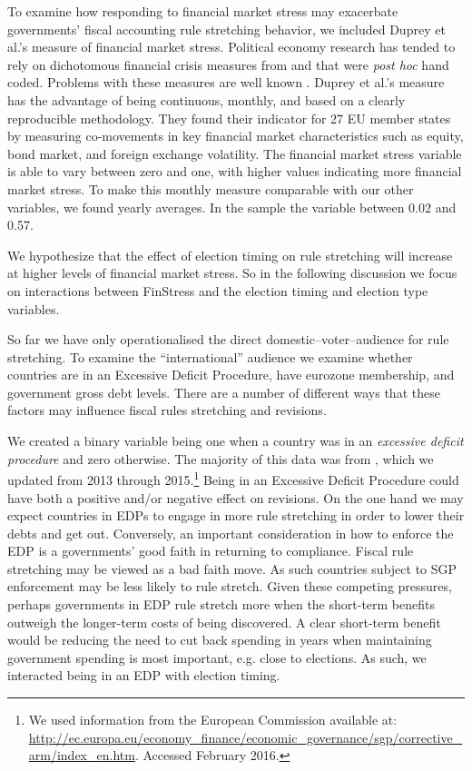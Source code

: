 \documentclass[]{article}
\begin{document}
To examine how responding to financial market stress may exacerbate governments' fiscal accounting rule stretching behavior, we included Duprey et al.'s \citeyearpar{ThibautDuprey2015} measure of financial market stress. Political economy research has tended to rely on dichotomous financial crisis measures from \cite{Laeven2012} and \cite{ReinhartRog2010} that were \emph{post hoc} hand coded. Problems with these measures are well known \citep[see][]{finstress_paper}. Duprey et al.'s measure has the advantage of being continuous, monthly, and based on a clearly reproducible methodology. They found their indicator for 27 EU member states by measuring co-movements in key financial market characteristics such as equity, bond market, and foreign exchange volatility. The financial market stress variable is able to vary between zero and one, with higher values indicating more financial market stress. To make this monthly measure comparable with our other variables, we found yearly averages. In the sample the variable  between 0.02 and 0.57.

We hypothesize that the effect of election timing on rule stretching will increase at higher levels of financial market stress. So in the following discussion we focus on interactions between FinStress and the election timing and election type variables. 

So far we have only operationalised the direct domestic--voter--audience for rule stretching. To examine the ``international'' audience we examine whether countries are in an Excessive Deficit Procedure, have eurozone membership, and  government gross debt levels.   There are a number of different ways that these factors may influence fiscal rules stretching and revisions.

We created a binary variable being one when a country was in an \emph{excessive deficit procedure} and zero otherwise. The majority of this data was from \cite{baergHallerberg2016}, which we updated from 2013 through 2015.\footnote{We used information from the European Commission available at: \url{http://ec.europa.eu/economy_finance/economic_governance/sgp/corrective_arm/index_en.htm}. Accessed February 2016.}  Being in an Excessive Deficit Procedure could have both a positive and/or negative effect on revisions. On the one hand we may expect countries in EDPs to engage in more rule stretching in order to lower their debts and get out. Conversely, an important consideration in how to enforce the EDP is a governments' good faith in returning to compliance. Fiscal rule stretching may be viewed as a bad faith move. As such countries subject to SGP enforcement may be less likely to rule stretch. Given these competing pressures, perhaps governments in EDP rule stretch more when the short-term benefits outweigh the longer-term costs of being discovered. A clear short-term benefit would be reducing the need to cut back spending in years when maintaining government spending is most important, e.g. close to elections. As such, we interacted being in an EDP with election timing.
\end{document}
